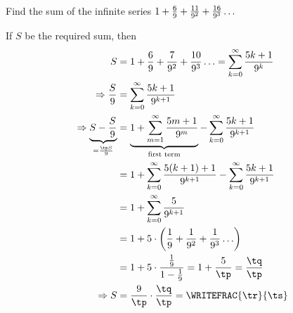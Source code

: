 \gcalcexpr[0]
\gcalcexpr[0]
\gcalcexpr[0]\tr{\vbone * \tq}
\gcalcexpr[0]\ts{\tp * \tp }


\question[4] Find the sum of the infinite series $1 + \frac{6}{9} + \frac{11}{9^2} + 
\frac{16}{9^3}\ldots$

\watchout
{}

\ifprintanswers
\fi 

\begin{solution}[\halfpage]
	If $S$ be the required sum, then
	\begin{align}
		S &= 1 + \frac{\vbthree}{\vbone} + \frac{7}{\vbone^2} + \frac{10}{\vbone^3}\ldots = 
      \sum_{k=0}^{\infty}\dfrac{\vbtwo k+1}{\vbone^k} \\
		\Rightarrow\dfrac{S}{\vbone} &= \sum_{k=0}^{\infty}\dfrac{\vbtwo k+1}{\vbone^{k+1}} \\
		\Rightarrow \underbrace{S - \dfrac{S}{\vbone}}_{= \frac{\tp S}{\vbone}} &= \underbrace{1 + \sum_{m=1}^{\infty}\dfrac{\vbtwo m+1}{\vbone^m}}
		_{\text{first term}}- \sum_{k=0}^{\infty}\dfrac{\vbtwo k+1}{\vbone^{k+1}} \\
		&= 1 + \sum_{k=0}^{\infty}\dfrac{\vbtwo (k+1)+1}{\vbone^{k+1}}-\sum_{k=0}^{\infty}\dfrac{\vbtwo k+1}{\vbone^{k+1}} \\
		&= 1 + \sum_{k=0}^{\infty}\dfrac{\vbtwo }{\vbone^{k+1}} \\
		&= 1 + \vbtwo\cdot\left( \dfrac{1}{\vbone} + \dfrac{1}{\vbone^2} + \dfrac{1}{\vbone^3}\ldots \right) \\
		&= 1 + \vbtwo\cdot\dfrac{\frac{1}{\vbone}}{1-\frac{1}{\vbone}} = 1 + \dfrac{\vbtwo}{\tp } = \dfrac{\tq}{\tp } \\
		\Rightarrow S &= \dfrac{\vbone}{\tp }\cdot\dfrac{\tq}{\tp } = \WRITEFRAC{\tr}{\ts}
	\end{align}
\end{solution}

